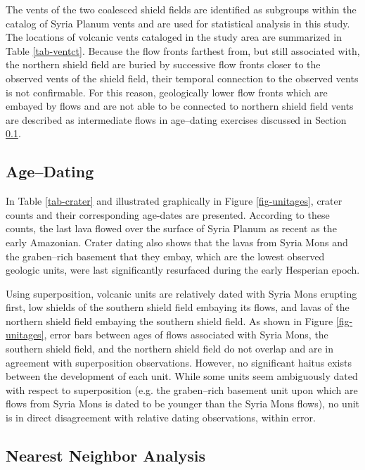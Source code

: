 \documentclass[preprint,review,authoryear,12pt]{elsarticle}
\begin{document}
The vents of the two coalesced shield fields are identified as subgroups within the catalog of Syria Planum vents and are used for statistical analysis in this study. The locations of volcanic vents cataloged in the study area are summarized in Table \ref{tab-ventct}. Because the flow fronts farthest from, but still associated with, the northern shield field are buried by successive flow fronts closer to the observed vents of the shield field, their temporal connection to the observed vents is not confirmable. For this reason, geologically lower flow fronts which are embayed by flows and are not able to be connected to northern shield field vents are described as intermediate flows in age--dating exercises discussed in Section \ref{sec:resultsAgeDating}.

\subsection{Age--Dating}
\label{sec:resultsAgeDating}

In Table \ref{tab-crater} and illustrated graphically in Figure \ref{fig-unitages}, crater counts and their corresponding age-dates are presented. According to these counts, the last lava flowed over the surface of Syria Planum as recent as the early Amazonian. Crater dating also shows that the lavas from Syria Mons and the graben--rich basement that they embay, which are the lowest observed geologic units, were last significantly resurfaced during the early Hesperian epoch.

Using superposition, volcanic units are relatively dated with Syria Mons erupting first, low shields of the southern shield field embaying its flows, and lavas of the northern shield field embaying the southern shield field. As shown in Figure \ref{fig-unitages}, error bars between ages of flows associated with Syria Mons, the southern shield field, and the northern shield field do not overlap and are in agreement with superposition observations. However, no significant haitus exists between the development of each unit. While some units seem ambiguously dated with respect to superposition (e.g. the graben--rich basement unit upon which are flows from Syria Mons is dated to be younger than the Syria Mons flows), no unit is in direct disagreement with relative dating observations, within error.

\subsection{Nearest Neighbor Analysis}
\end{document}
